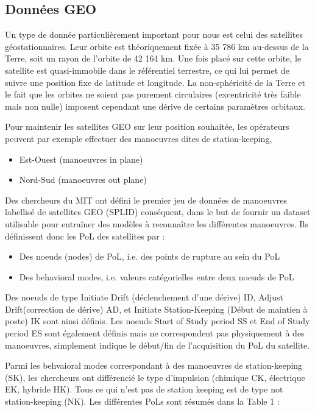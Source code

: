 \documentclass{article}
\begin{document}
\subsection{Données GEO}

\par       
Un type de donnée particulièrement important pour nous est celui des satellites géostationnaires.
Leur orbite est théoriquement fixée à 35 786 km au-dessus de la Terre, soit un rayon de l'orbite de 42 164 km.
Une fois placé sur cette orbite, le satellite est quasi-immobile dans le référentiel terrestre, ce qui lui permet de suivre une position fixe de latitude et longitude. 
La non-sphéricité de la Terre et le fait que les orbites ne soient pas purement circulaires (excentricité très faible mais non nulle) imposent cependant une dérive de certains paramètres orbitaux.


Pour maintenir les satellites GEO sur leur position souhaitée, les opérateurs peuvent par exemple effectuer des manoeuvres dites de station-keeping, 
\begin{itemize}
    \item Est-Ouest (manoeuvres in plane)
    \item Nord-Sud (manoeuvres out plane)
\end{itemize}

\par 
Des chercheurs du MIT ont défini le premier jeu de données de manoeuvres labellisé de satellites GEO (SPLID) conséquent,
dans le but de fournir un dataset utilisable pour entraîner des modèles à reconnaître les différentes manoeuvres.
Ils définissent donc les PoL des satellites par : 
\begin{itemize}
    \item Des noeuds (nodes) de PoL, i.e. des points de rupture au sein du PoL
    \item Des behavioral modes, i.e. valeurs catégorielles entre deux noeuds de PoL 
\end{itemize}
Des noeuds de type Initiate Drift (déclenchement d'une dérive) ID, Adjust Drift(correction de dérive) AD, et Initiate Station-Keeping (Début de maintien à poste) IK sont ainsi définis. 
Les noeuds Start of Study period SS et End of Study period ES sont également définis mais ne correspondent pas physiquement à des manoeuvres, simplement indique le début/fin de l'acquisition du PoL du satellite.


Parmi les behvaioral modes correspondant à des manoeuvres de station-keeping (SK), les chercheurs ont différencié le type d'impulsion (chimique CK, électrique EK, hybride HK). 
Tous ce qui n'est pas de station keeping est de type not station-keeping (NK). 
Les différentes PoLs sont résumés dans la Table 1 :
\end{document}
